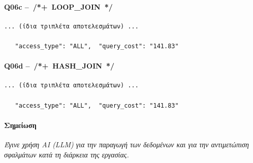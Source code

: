 \documentclass[a4paper,12pt]{article}
\begin{document}
\paragraph{Q06c – /*+ LOOP\_JOIN */}
\begin{lstlisting}
... (ίδια τριπλέτα αποτελεσμάτων) ...

   "access_type": "ALL",  "query_cost": "141.83"
\end{lstlisting}

\paragraph{Q06d – /*+ HASH\_JOIN */}
\begin{lstlisting}
... (ίδια τριπλέτα αποτελεσμάτων) ...

   "access_type": "ALL",  "query_cost": "141.83"
\end{lstlisting}
\paragraph{Σημείωση}
\textit{Έγινε χρήση AI (LLM) για την παραγωγή των δεδομένων και για την αντιμετώπιση σφαλμάτων κατά τη διάρκεια της εργασίας.}
\end{document}
